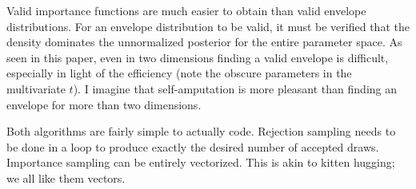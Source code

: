 \documentclass[12pt]{article}
\begin{document}
\noindent Valid importance functions are much easier to obtain than valid envelope distributions. For an envelope distribution to be valid, it must be verified that the density dominates the unnormalized posterior for the entire parameter space. As seen in this paper, even in two dimensions finding a valid envelope is difficult, especially in light of the efficiency (note the obscure parameters in the multivariate $t$). I imagine that self-amputation is more pleasant than finding an envelope for more than two dimensions.
\bigskip

\noindent Both algorithms are fairly simple to actually code. Rejection sampling needs to be done in a loop to produce exactly the desired number of accepted draws. Importance sampling can be entirely vectorized. This is akin to kitten hugging; we all like them vectors.
\end{document}
